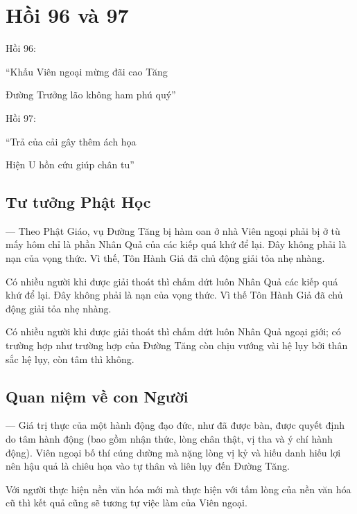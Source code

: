 \chapter{Hồi 96 và 97} %
\label{cha:hoi_96_97}

Hồi 96:

\begin{itshape}
``Khấu Viên ngoại mừng đãi cao Tăng

Đường Trưởng lão không ham phú quý''
\end{itshape}

Hồi 97:

\begin{itshape}
``Trả của cải gây thêm ách họa

Hiện U hồn cứu giúp chân tu''
\end{itshape}

\section{Tư tưởng Phật Học} %
\label{sec:96_97_phat_hoc}

— Theo Phật Giáo, vụ Đường Tăng bị hàm oan ở nhà Viên ngoại phải bị ở tù mấy hôm chỉ là phần Nhân Quả của các kiếp quá khứ để lại. Đây không phải là nạn của vọng thức. Vì thế, Tôn Hành Giả đã chủ động giải tỏa nhẹ nhàng.

Có nhiều người khi được giải thoát thì chấm dứt luôn Nhân Quả các kiếp quá khứ để lại. Đây không phải là nạn của vọng thức. Vì thế Tôn Hành Giả đã chủ động giải tỏa nhẹ nhàng.

Có nhiều người khi được giải thoát thì chấm dứt luôn Nhân Quả ngoại giới; có trường hợp như trường hợp của Đường Tăng còn chịu vướng vài hệ lụy bởi thân sắc hệ lụy, còn tâm thì không.

\section{Quan niệm về con Người} %
\label{sec:96_97_con_nguoi}

— Giá trị thực của một hành động đạo đức, như đã được bàn, được quyết định do tâm hành động (bao gồm nhận thức, lòng chân thật, vị tha và ý chí hành động). Viên ngoại bố thí cúng dường mà nặng lòng vị kỷ và hiếu danh hiếu lợi nên hậu quả là chiêu họa vào tự thân và liên lụy đến Đường Tăng.

Với người thực hiện nền văn hóa mới mà thực hiện với tấm lòng của nền văn hóa cũ thì kết quả cũng sẽ tương tự việc làm của Viên ngoại.

